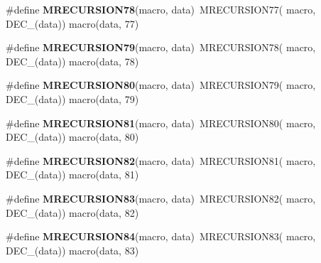 \begin{DoxyCompactItemize}
\item 
\hypertarget{group__group__sam0__utils__mrecursion_ga44f0f6b328ba8fb25e23a395afb8da8a}{}\#define {\bfseries M\+R\+E\+C\+U\+R\+S\+I\+O\+N78}(macro,  data)~M\+R\+E\+C\+U\+R\+S\+I\+O\+N77(  macro, D\+E\+C\+\_\+(data))   macro(data, 77)\label{group__group__sam0__utils__mrecursion_ga44f0f6b328ba8fb25e23a395afb8da8a}

\item 
\hypertarget{group__group__sam0__utils__mrecursion_ga5e756a7c7f7758383e87c19208a6090c}{}\#define {\bfseries M\+R\+E\+C\+U\+R\+S\+I\+O\+N79}(macro,  data)~M\+R\+E\+C\+U\+R\+S\+I\+O\+N78(  macro, D\+E\+C\+\_\+(data))   macro(data, 78)\label{group__group__sam0__utils__mrecursion_ga5e756a7c7f7758383e87c19208a6090c}

\item 
\hypertarget{group__group__sam0__utils__mrecursion_gaa1146bb36552aac6b2de5b2a51f0d08c}{}\#define {\bfseries M\+R\+E\+C\+U\+R\+S\+I\+O\+N80}(macro,  data)~M\+R\+E\+C\+U\+R\+S\+I\+O\+N79(  macro, D\+E\+C\+\_\+(data))   macro(data, 79)\label{group__group__sam0__utils__mrecursion_gaa1146bb36552aac6b2de5b2a51f0d08c}

\item 
\hypertarget{group__group__sam0__utils__mrecursion_gaa8cd222526861d88895eed35926c7745}{}\#define {\bfseries M\+R\+E\+C\+U\+R\+S\+I\+O\+N81}(macro,  data)~M\+R\+E\+C\+U\+R\+S\+I\+O\+N80(  macro, D\+E\+C\+\_\+(data))   macro(data, 80)\label{group__group__sam0__utils__mrecursion_gaa8cd222526861d88895eed35926c7745}

\item 
\hypertarget{group__group__sam0__utils__mrecursion_ga8ba880263ec8b032074474cb8514ef0c}{}\#define {\bfseries M\+R\+E\+C\+U\+R\+S\+I\+O\+N82}(macro,  data)~M\+R\+E\+C\+U\+R\+S\+I\+O\+N81(  macro, D\+E\+C\+\_\+(data))   macro(data, 81)\label{group__group__sam0__utils__mrecursion_ga8ba880263ec8b032074474cb8514ef0c}

\item 
\hypertarget{group__group__sam0__utils__mrecursion_ga1f2ba2104038509ab3e8b791d2d21777}{}\#define {\bfseries M\+R\+E\+C\+U\+R\+S\+I\+O\+N83}(macro,  data)~M\+R\+E\+C\+U\+R\+S\+I\+O\+N82(  macro, D\+E\+C\+\_\+(data))   macro(data, 82)\label{group__group__sam0__utils__mrecursion_ga1f2ba2104038509ab3e8b791d2d21777}

\item 
\hypertarget{group__group__sam0__utils__mrecursion_ga31ee69249c9a70670bb46444ee959831}{}\#define {\bfseries M\+R\+E\+C\+U\+R\+S\+I\+O\+N84}(macro,  data)~M\+R\+E\+C\+U\+R\+S\+I\+O\+N83(  macro, D\+E\+C\+\_\+(data))   macro(data, 83)\label{group__group__sam0__utils__mrecursion_ga31ee69249c9a70670bb46444ee959831}


\end{DoxyCompactItemize}

